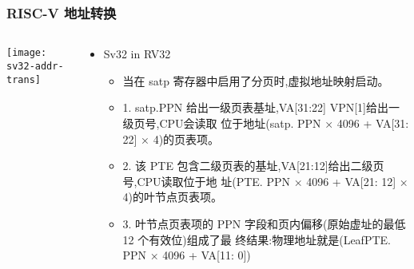 \begin{frame} 
\frametitle{RISC-V 地址转换}

\begin{columns}
	
	\begin{column}{.4\textwidth}
		
		\texttt{[image: sv32-addr-trans]}
		
	\end{column}
	
	
	\begin{column}{.6\textwidth}
		
		\begin{itemize}
			\item Sv32 in RV32
			\begin{itemize}
				\item 当在 satp 寄存器中启用了分页时,虚拟地址映射启动。
				 \item 1. satp.PPN 给出一级页表基址,VA[31:22] VPN[1]给出一级页号,CPU会读取
				位于地址(satp. PPN × 4096 + VA[31: 22] × 4)的页表项。 \pause
				\item 2. 该 PTE 包含二级页表的基址,VA[21:12]给出二级页号,CPU读取位于地
				址(PTE. PPN × 4096 + VA[21: 12] × 4)的叶节点页表项。  \pause
				\item 3. 叶节点页表项的 PPN 字段和页内偏移(原始虚址的最低 12 个有效位)组成了最
				终结果:物理地址就是(LeafPTE. PPN × 4096 + VA[11: 0])
				
			\end{itemize}
		\end{itemize}
		
		
		
	\end{column}
	
	
\end{columns}
\end{frame}

